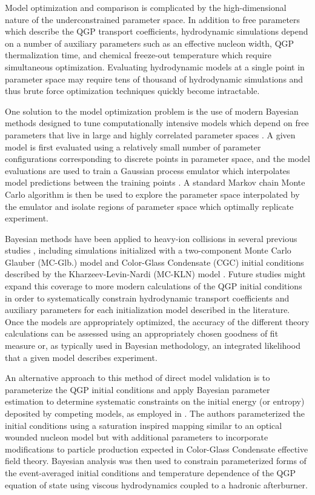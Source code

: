 \documentclass[aps,prc,reprint,amsmath,nofootinbib,superscriptaddress]{revtex4-1}
\begin{document}
Model optimization and comparison is complicated by the high-dimensional nature of the underconstrained parameter space.
In addition to free parameters which describe the QGP transport coefficients, hydrodynamic simulations depend on a number of auxiliary parameters such as an effective nucleon width, QGP thermalization time, and chemical freeze-out temperature which require simultaneous optimization.
Evaluating hydrodynamic models at a single point in parameter space may require tens of thousand of hydrodynamic simulations and thus brute force optimization techniques quickly become intractable.

One solution to the model optimization problem is the use of modern Bayesian methods designed to tune computationally intensive models which depend on free parameters that live in large and highly correlated parameter spaces \cite{OHagan:2006ba, Higdon:2008cmc, Higdon:2014tva,Wesolowski:2015fqa}.
A given model is first evaluated using a relatively small number of parameter configurations corresponding to discrete points in parameter space, and the model evaluations are used to train a Gaussian process emulator which interpolates model predictions between the training points \cite{Rasmussen:2006gp}.
A standard Markov chain Monte Carlo algorithm is then be used to explore the parameter space interpolated by the emulator and isolate regions of parameter space which optimally replicate experiment.

Bayesian methods have been applied to heavy-ion collisions in several previous studies \cite{Novak:2013bqa, Pratt:2015zsa, Bernhard:2015hxa, Sangaline:2015isa}, including simulations initialized with a two-component Monte Carlo Glauber (MC-Glb.) model and Color-Glass Condensate (CGC) initial conditions described by the Kharzeev-Levin-Nardi (MC-KLN) model \cite{Bernhard:2015hxa}.
Future studies might expand this coverage to more modern calculations of the QGP initial conditions in order to systematically constrain hydrodynamic transport coefficients and auxiliary parameters for each initialization model described in the literature.
Once the models are appropriately optimized, the accuracy of the different theory calculations can be assessed using an appropriately chosen goodness of fit measure or, as typically used in Bayesian methodology, an integrated likelihood that a given model describes experiment.

An alternative approach to this method of direct model validation is to parameterize the QGP initial conditions and apply Bayesian parameter estimation to determine systematic constraints on the initial energy (or entropy) deposited by competing models, as employed in \cite{Novak:2013bqa, Pratt:2015zsa, Sangaline:2015isa}.
The authors parameterized the initial conditions using a saturation inspired mapping similar to an optical wounded nucleon model but with additional parameters to incorporate modifications to particle production expected in Color-Glass Condensate effective field theory.
Bayesian analysis was then used to constrain parameterized forms of the event-averaged initial conditions and temperature dependence of the QGP equation of state using viscous hydrodynamics coupled to a hadronic afterburner.
\end{document}
